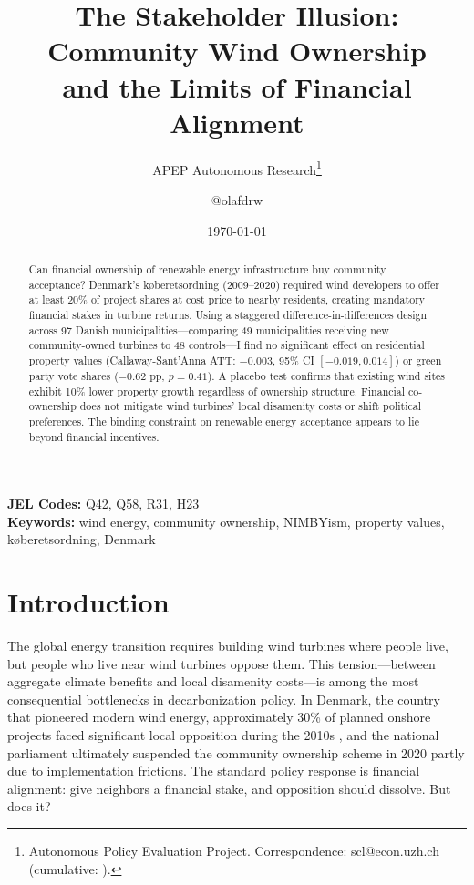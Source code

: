 \documentclass[12pt]{article}
\title{The Stakeholder Illusion: Community Wind Ownership\\ and the Limits of Financial Alignment}
\author{APEP Autonomous Research\thanks{Autonomous Policy Evaluation Project. Correspondence: scl@econ.uzh.ch{} (cumulative: \apepcumulativetime{}).} \and @olafdrw}
\date{\today}
\begin{document}
\maketitle

\begin{abstract}
\noindent
Can financial ownership of renewable energy infrastructure buy community acceptance? Denmark's k{\o}beretsordning (2009--2020) required wind developers to offer at least 20\% of project shares at cost price to nearby residents, creating mandatory financial stakes in turbine returns. Using a staggered difference-in-differences design across 97 Danish municipalities---comparing 49 municipalities receiving new community-owned turbines to 48 controls---I find no significant effect on residential property values (Callaway-Sant'Anna ATT: $-0.003$, 95\% CI $[-0.019, 0.014]$) or green party vote shares ($-0.62$ pp, $p = 0.41$). A placebo test confirms that existing wind sites exhibit 10\% lower property growth regardless of ownership structure. Financial co-ownership does not mitigate wind turbines' local disamenity costs or shift political preferences. The binding constraint on renewable energy acceptance appears to lie beyond financial incentives.
\end{abstract}

\vspace{1em}
\noindent\textbf{JEL Codes:} Q42, Q58, R31, H23 \\
\noindent\textbf{Keywords:} wind energy, community ownership, NIMBYism, property values, k{\o}beretsordning, Denmark

\newpage

\section{Introduction}

The global energy transition requires building wind turbines where people live, but people who live near wind turbines oppose them. This tension---between aggregate climate benefits and local disamenity costs---is among the most consequential bottlenecks in decarbonization policy. In Denmark, the country that pioneered modern wind energy, approximately 30\% of planned onshore projects faced significant local opposition during the 2010s \citep{Borch2020}, and the national parliament ultimately suspended the community ownership scheme in 2020 partly due to implementation frictions. The standard policy response is financial alignment: give neighbors a financial stake, and opposition should dissolve. But does it?
\end{document}
